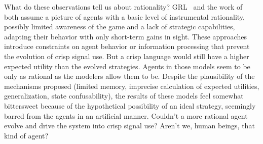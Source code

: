 \documentclass[a4paper]{article}
\begin{document}
What do these observations tell us about rationality?
GRL~\parencite{oconnor_evolution_2014} and the work of~\textcite{franke_vagueness_2017} both assume a picture of agents with a basic level of instrumental rationality, possibly limited awareness of the game and a lack of strategic capabilities, adapting their behavior with only short-term gains in sight.
These approaches introduce constraints on agent behavior or information processing that prevent the evolution of crisp signal use.
But a crisp language would still have a higher expected utility than the evolved strategies.
Agents in those models seem to be only as rational as the modelers allow them to be.
Despite the plausibility of the mechanisms proposed (limited memory, imprecise calculation of expected utilities, generalization, state confusability), the results of these models feel somewhat bittersweet because of the hypothetical possibility of an ideal strategy, seemingly barred from the agents in an artificial manner.
Couldn't a more rational agent evolve and drive the system into crisp signal use?
Aren't we, human beings, that kind of agent?
\end{document}
